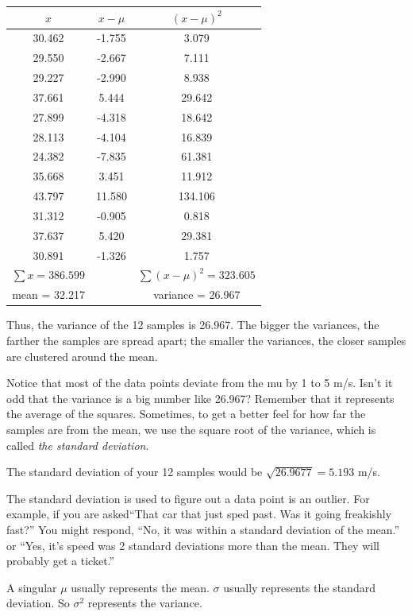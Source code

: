 \begin{tabular} {c | c | c}

  $x$ & $x - \mu$ & $(x - \mu)^2$\\
  \hline
30.462 & -1.755 & 3.079 \\
29.550 & -2.667 & 7.111\\
29.227 & -2.990 & 8.938\\
37.661 & 5.444 & 29.642\\
27.899 & -4.318 & 18.642\\
28.113 & -4.104 & 16.839 \\
24.382 & -7.835 & 61.381 \\
35.668 & 3.451 & 11.912 \\
43.797 & 11.580 & 134.106\\
31.312 & -0.905 & 0.818\\
37.637 & 5.420 & 29.381\\
30.891 & -1.326 & 1.757\\
\hline
$\sum x = 386.599$ & & $\sum (x - \mu)^2 = 323.605$\\
mean = 32.217 & & variance = 26.967
\end{tabular}

Thus, the variance of the 12 samples is 26.967. The bigger the variances, 
the farther the samples are spread apart; the smaller the variances, the closer
samples are clustered around the mean.

Notice that most of the data points deviate from the mu by 1 to 5
m/s. Isn't it odd that the variance is a big number like 26.967?
Remember that it represents the average of the squares. Sometimes, to
get a better feel for how far the samples are from the mean, we use
the square root of the variance, which is called \textit{the standard
  deviation}.

The standard deviation of your 12 samples would be $\sqrt{26.9677} =
  5.193$ m/s.

The standard deviation is used to figure out a data point is an
outlier. For example, if you are asked``That car that just sped
past. Was it going freakishly fast?'' You might respond, ``No, it was
within a standard deviation of the mean.'' or ``Yes, it's speed was 2
standard deviations more than the mean. They will probably get a ticket.''

A singular $\mu$ usually represents the mean. $\sigma$ usually represents
the standard deviation. So $\sigma^2$ represents the variance.

